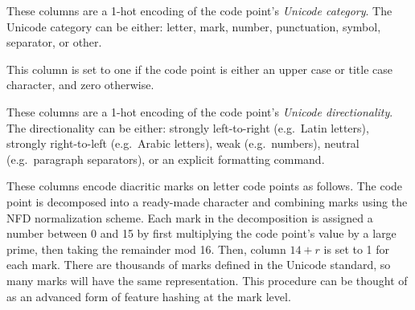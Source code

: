 \documentclass[sigconf,anonymous,review]{acmart}
\newcommand{\str}[1]{\texttt{#1}}
\newcommand{\defn}[1]{\textit{#1}}
\begin{document}
\begin{description}
\begin{description}[font=\normalfont\itshape]
\item[Columns 1-7:]
    These columns are a 1-hot encoding of the code point's \defn{Unicode category}.
    The Unicode category can be either:
%
letter,
mark,
number,
punctuation,
symbol,
separator,
or other.

\item[Column 8:]
This column is set to one if the code point is either an upper case or title case character,
and zero otherwise.

\item[Columns 9-13:]
    These columns are a 1-hot encoding of the code point's \defn{Unicode directionality}.
    The directionality can be either:
strongly left-to-right (e.g.\ Latin letters),
strongly right-to-left (e.g.\ Arabic letters),
weak (e.g.\ numbers),
neutral (e.g.\ paragraph separators),
or an explicit formatting command.

\item[Columns 14-29:]
These columns encode diacritic marks on letter code points as follows.
The code point is decomposed into a ready-made character and combining marks using the NFD normalization scheme.
Each mark in the decomposition is assigned a number between 0 and 15 by first multiplying the code point's value by a large prime, 
then taking the remainder mod 16.
Then, column $14+r$ is set to 1 for each mark.
There are thousands of marks defined in the Unicode standard,
so many marks will have the same representation.
This procedure can be thought of as an advanced form of feature hashing \citep{weinberger2009feature} at the mark level.


\end{description}
\end{description}
\end{document}
